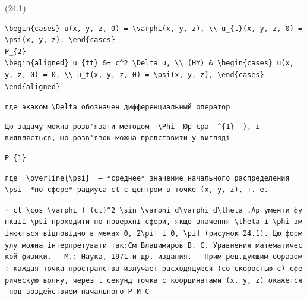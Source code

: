 \documentclass[
  ukrainian,
]{article}
\begin{document}
(24.1)

\begin{verbatim}
\begin{cases} u(x, y, z, 0) = \varphi(x, y, z), \\ u_{t}(x, y, z, 0) = \psi(x, y, z). \end{cases}
P_{2}
\begin{aligned} u_{tt} &= c^2 \Delta u, \\ (HY) & \begin{cases} u(x, y, z, 0) = 0, \\ u_t(x, y, z, 0) = \psi(x, y, z), \end{cases} \end{aligned}
\end{verbatim}

\texttt{где\ экаком\ \textquotesingle{}\textbackslash{}Delta\textquotesingle{}\ обозначен\ дифференциальный\ оператор}

\begin{verbatim}
Цю задачу можна розв'язати методом  \Phi  Юр'єра  ^{1}  ), і виявляється, що розв'язок можна представити у вигляді
\end{verbatim}

\begin{verbatim}
P_{1}
\end{verbatim}

\begin{verbatim}
где  \overline{\psi}  — *среднее* значение начального распределения  \psi  *по сфере* радиуса ct с центром в точке (x, y, z), т. е.
\end{verbatim}

\texttt{\textquotesingle{}+\ ct\ \textbackslash{}cos\ \textbackslash{}varphi\textquotesingle{}\ )\ \textquotesingle{}(ct)\^{}2\ \textbackslash{}sin\ \textbackslash{}varphi\ d\textbackslash{}varphi\ d\textbackslash{}theta\textquotesingle{}\ .Аргументи\ функції\ \textquotesingle{}\textbackslash{}psi\textquotesingle{}\ проходити\ по\ поверхні\ сфери,\ якщо\ значення\ \textquotesingle{}\textbackslash{}theta\textquotesingle{}\ і\ \textquotesingle{}\textbackslash{}phi\textquotesingle{}\ змінюються\ відповідно\ в\ межах\ \textquotesingle{}{[}0,\ 2\textbackslash{}pi{]}\textquotesingle{}\ і\ \textquotesingle{}{[}0,\ \textbackslash{}pi{]}\textquotesingle{}\ (рисунок\ 24.1).\ Цю\ формулу\ можна\ інтерпретувати\ так:См\ Владимиров\ В.\ С.\ Уравнения\ математической\ физики.\ —\ М.:\ Наука,\ 1971\ и\ др.\ издания.\ —\ Прим\ ред.дующим\ образом:\ каждая\ точка\ пространства\ излучает\ расходящуюся\ (со\ скоростью\ c)\ сферическую\ волну,\ через\ t\ секунд\ точка\ с\ координатами\ (x,\ y,\ z)\ окажется\ под\ воздействием\ начального\ Р\ И\ С}
\end{document}
